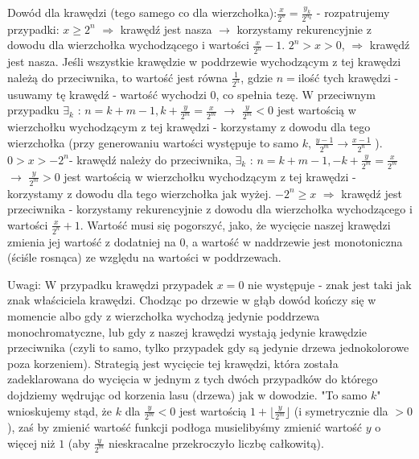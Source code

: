 \documentclass{article}
\begin{document}
Dowód dla krawędzi (tego samego co dla wierzchołka):$\frac{x}{2^n}=\frac{y_k}{2^{n_k}}$ - rozpatrujemy przypadki:\newline
$x\ge2^n$ $\Rightarrow$ krawędź jest nasza $\rightarrow$ korzystamy rekurencyjnie z dowodu dla wierzchołka wychodzącego i wartości $\frac{x}{2^n}-1$.\newline
$2^n>x>0$, $\Rightarrow$ krawędź jest nasza.\newline
Jeśli wszystkie krawędzie w poddrzewie wychodzącym z tej krawędzi należą do przeciwnika,
to wartość jest równa $\frac{1}{2^n}$, gdzie $n=$ilość tych krawędzi - usuwamy tę krawędź - wartość wychodzi $0$, co spełnia tezę.
W przeciwnym przypadku $\exists_k$ : $n=k+m-1,k+\frac{y}{2^m}=\frac{x}{2^m}$ $\rightarrow$ $\frac{y}{2^m}<0$ jest wartością w wierzchołku wychodzącym z tej krawędzi
- korzystamy z dowodu dla tego wierzchołka (przy generowaniu wartości występuje to samo $k$, $\frac{y-1}{2^m}\rightarrow\frac{x-1}{2^n}$ ).\newline
$0>x>-2^n$- krawędź należy do przeciwnika, $\exists_k$ : $n=k+m-1,-k+\frac{y}{2^m}=\frac{x}{2^m}$ $\rightarrow$ $\frac{y}{2^m}>0$ jest wartością w wierzchołku wychodzącym z tej krawędzi
- korzystamy z dowodu dla tego wierzchołka jak wyżej.\newline
$-2^n\ge x$ $\Rightarrow$ krawędź jest przeciwnika - korzystamy rekurencyjnie z dowodu dla wierzchołka wychodzącego i wartości $\frac{x}{2^n}+1$.\newline
Wartość musi się pogorszyć, jako, że wycięcie naszej krawędzi zmienia jej wartość z dodatniej na $0$, a wartość w naddrzewie jest monotoniczna
(ściśle rosnąca) ze względu na wartości w poddrzewach.\newline\newline


Uwagi:
W przypadku krawędzi przypadek $x=0$ nie występuje - znak jest taki jak znak właściciela krawędzi.\newline
Chodząc po drzewie w głąb dowód kończy się w momencie albo gdy z wierzchołka wychodzą jedynie poddrzewa monochromatyczne,
lub gdy z naszej krawędzi wystają jedynie krawędzie przeciwnika (czyli to samo, tylko przypadek gdy są jedynie drzewa jednokolorowe poza korzeniem).\newline
Strategią jest wycięcie tej krawędzi, która została zadeklarowana do wycięcia w jednym z tych dwóch przypadków do którego dojdziemy wędrując od korzenia lasu
(drzewa) jak w dowodzie.
"To samo $k$" wnioskujemy stąd, że $k$ dla $\frac{y}{2^m}<0$ jest wartością $1+\lfloor\frac{y}{2^m}\rfloor$ (i symetrycznie dla $>0$),
zaś by zmienić wartość funkcji podłoga musielibyśmy zmienić wartość $y$ o więcej niż $1$ (aby $\frac{y}{2^m}$ nieskracalne przekroczyło liczbę całkowitą). 
\end{document}
